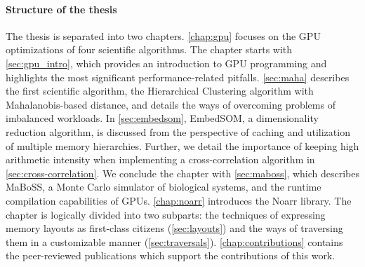 \paragraph{Structure of the thesis}

The thesis is separated into two chapters. \cref{chap:gpu} focuses on the GPU optimizations of four scientific algorithms. The chapter starts with \cref{sec:gpu_intro}, which provides an introduction to GPU programming and highlights the most significant performance-related pitfalls. \cref{sec:maha} describes the first scientific algorithm, the Hierarchical Clustering algorithm with Mahalanobis-based distance, and details the ways of overcoming problems of imbalanced workloads. In \cref{sec:embedsom}, EmbedSOM, a dimensionality reduction algorithm, is discussed from the perspective of caching and utilization of multiple memory hierarchies. Further, we detail the importance of keeping high arithmetic intensity when implementing a cross-correlation algorithm in \cref{sec:cross-correlation}. We conclude the chapter with \cref{sec:maboss}, which describes MaBoSS, a Monte Carlo simulator of biological systems, and the runtime compilation capabilities of GPUs. \cref{chap:noarr} introduces the Noarr library. The chapter is logically divided into two subparts: the techniques of expressing memory layouts as first-class citizens (\cref{sec:layouts}) and the ways of traversing them in a customizable manner (\cref{sec:traversals}). \cref{chap:contributions} contains the peer-reviewed publications which support the contributions of this work.
